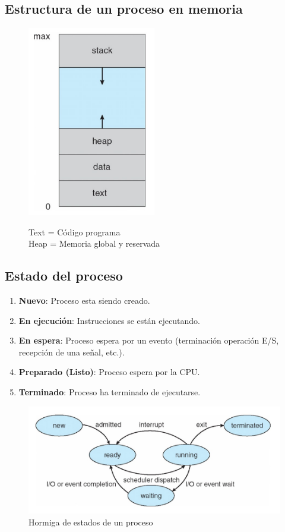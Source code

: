 \documentclass{templateNote}
\begin{document}
\subsection*{Estructura de un proceso en memoria}
\begin{figure}[H]
    \centering
    \includegraphics[width=0.5\textwidth]{img/estProceso.png}

    Text = Código programa \\
    Heap = Memoria global y reservada
\end{figure}

\subsection*{Estado del proceso}
\begin{enumerate}
    \item \textbf{Nuevo}: Proceso esta siendo creado.
    \item \textbf{En ejecución}: Instrucciones se están ejecutando.
    \item \textbf{En espera}: Proceso espera por un evento (terminación operación E/S, recepción de una señal, etc.).
    \item \textbf{Preparado (Listo)}: Proceso espera por la CPU.
    \item \textbf{Terminado}: Proceso ha terminado de ejecutarse.
\end{enumerate}
\begin{figure}[H]
    \centering
    \includegraphics[width=\textwidth]{img/estadosProceso.png}
    \caption{Hormiga de estados de un proceso}
    \label{fig:hormiga-estados}
\end{figure}
\end{document}
